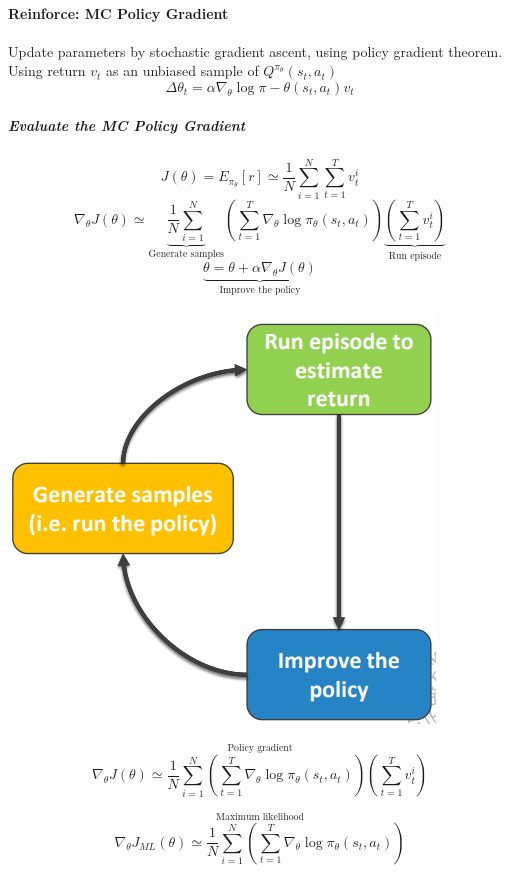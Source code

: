 \documentclass[10pt]{report}
\begin{document}
\paragraph{Reinforce: MC Policy Gradient} Update parameters by stochastic gradient ascent, using policy gradient theorem.\\
Using return $v_t$ as an unbiased sample of $Q^{\pi_\theta}(s_t,a_t)$
$$\Delta\theta_t = \alpha\nabla_\theta\log\pi-\theta(s_t,a_t)v_t$$
\pagebreak
\subparagraph{Evaluate the MC Policy Gradient}
\begin{multicols}{2}
$$J(\theta) = E_{\pi_\theta}[r]\simeq\frac{1}{N}\sum_{i=1}^N\sum_{t=1}^T v_t^i$$
$$\nabla_\theta J(\theta) \simeq \underset{\text{Generate samples}}{\underbrace{\frac{1}{N}\sum_{i=1}^N}}\left(\sum_{t=1}^T\nabla_\theta\log\pi_\theta(s_t,a_t)\right)\underset{\text{Run episode}}{\underbrace{\left(\sum_{t=1}^Tv_t^i\right)}}$$
$$\underset{\text{Improve the policy}}{\underbrace{\theta = \theta + \alpha\nabla_\theta J(\theta)}}$$
\columnbreak
\begin{center}
	\includegraphics[scale=0.5]{182.png}
\end{center}
\end{multicols}
\begin{multicols}{2}
$$\overset{\text{Policy gradient}}{\nabla_\theta J(\theta) \simeq \frac{1}{N}\sum_{i=1}^N \left(\sum_{t=1}^T\nabla_\theta\log\pi_\theta(s_t,a_t)\right)\left(\sum_{t=1}^Tv_t^i\right)}$$

$$\overset{\text{Maximum likelihood}}{\nabla_\theta J_{ML}(\theta) \simeq \frac{1}{N}\sum_{i=1}^N \left(\sum_{t=1}^T\nabla_\theta\log\pi_\theta(s_t,a_t)\right)}$$
\end{multicols}
\end{document}
